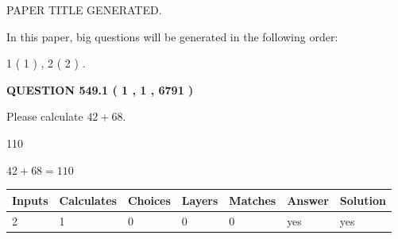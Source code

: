 \documentclass[12pt]{article}
\begin{document}
   
\vspace{0.2in}
   
   
   
   
   
   
   
   
 \vspace{0.2in}
 
 
 
 
   
   
 PAPER TITLE GENERATED.
   
   
   
\vspace{0.2in}
   
In this paper, big questions will be generated in the following order: 
   
   
   1 ( 1 )
 ,
   2 ( 2 )
 .
  
\vspace{0.2in}
  
{\textbf{\Large{QUESTION
549.1 
 ( 1 , 1 , 6791 )
}}}
  
  
 
Please calculate $ %
42 +  %
68 $.
 
 
 
\noindent{}
 
 

110
 
 
\noindent{}
 
 

 
 
 
\noindent{}
 
 

$ %
42 +  %
68=   %
110$
 
 
\noindent{}
 
 

 
   
   
   
   
\noindent\begin{tabular}{|l|l|l|l|l|l|l|}
 \hline
Inputs & Calculates & Choices & Layers & Matches & Answer & Solution \\ \hline
 2  & 
 1  & 
 0
  & 
 0  & 
 0  & 
  yes & 
  yes 
  \\ \hline
 \end{tabular}
   
\end{document}
